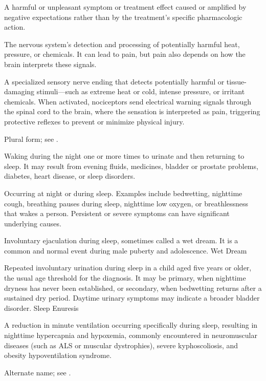  A harmful or unpleasant symptom or treatment effect caused or amplified by negative expectations rather than by the treatment’s specific pharmacologic action.

 The nervous system's detection and processing of potentially harmful heat, pressure, or chemicals. It can lead to pain, but pain also depends on how the brain interprets these signals.

 A specialized sensory nerve ending that detects potentially harmful or tissue-damaging stimuli---such as extreme heat or cold, intense pressure, or irritant chemicals. When activated, nociceptors send electrical warning signals through the spinal cord to the brain, where the sensation is interpreted as pain, triggering protective reflexes to prevent or minimize physical injury.

 Plural form; see .

 Waking during the night one or more times to urinate and then returning to sleep. It may result from evening fluids, medicines, bladder or prostate problems, diabetes, heart disease, or sleep disorders.

 Occurring at night or during sleep. Examples include bedwetting, nighttime cough, breathing pauses during sleep, nighttime low oxygen, or breathlessness that wakes a person. Persistent or severe symptoms can have significant underlying causes.

 Involuntary ejaculation during sleep, sometimes called a wet dream. It is a common and normal event during male puberty and adolescence.
\synonyms
Wet Dream

 Repeated involuntary urination during sleep in a child aged five years or older, the usual age threshold for the diagnosis. It may be primary, when nighttime dryness has never been established, or secondary, when bedwetting returns after a sustained dry period. Daytime urinary symptoms may indicate a broader bladder disorder.
\synonyms
Sleep Enuresis

 A reduction in minute ventilation occurring specifically during sleep, resulting in nighttime hypercapnia and hypoxemia, commonly encountered in neuromuscular diseases (such as ALS or muscular dystrophies), severe kyphoscoliosis, and obesity hypoventilation syndrome.

 Alternate name; see .

